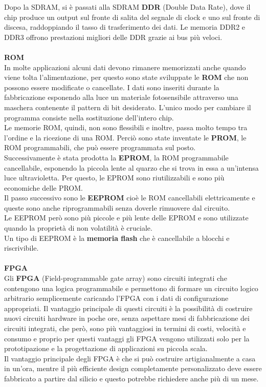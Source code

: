 \documentclass[12pt]{report}
\begin{document}
			Dopo la SDRAM, si è passati alla SDRAM \textbf{DDR} (Double Data Rate), dove il chip produce un output sul fronte di salita del segnale di clock e uno sul fronte di discesa, raddoppiando il tasso di trasferimento dei dati. Le memoria DDR2 e DDR3 offrono prestazioni migliori delle DDR grazie ai bus più veloci. \\ \\
			\textbf{ROM} \\
			In molte applicazioni alcuni dati devono rimanere memorizzati anche quando viene tolta l'alimentazione, per questo sono state sviluppate le \textbf{ROM} che non possono essere modificate o cancellate. I dati sono inseriti durante la fabbricazione esponendo alla luce un materiale fotosensibile attraverso una maschera contenente il pattern di bit desiderato. L'unico modo per cambiare il programma consiste nella sostituzione dell'intero chip. \\
			Le memorie ROM, quindi, non sono flessibili e inoltre, passa molto tempo tra l'ordine e la ricezione di una ROM. Perciò sono state inventate le \textbf{PROM}, le ROM programmabili, che può essere programmata sul posto. \\
			Successivamente è stata prodotta la \textbf{EPROM}, la ROM programmabile cancellabile, esponendo la piccola lente al quarzo che si trova in essa a un'intensa luce ultravioletta. Per questo, le EPROM sono riutilizzabili e sono più economiche delle PROM. \\
			Il passo successivo sono le \textbf{EEPROM} cioè le ROM cancellabili elettricamente e queste sono anche riprogrammabili senza doverle rimuovere dal circuito. \\
			Le EEPROM però sono più piccole e più lente delle EPROM e sono utilizzate quando la proprietà di non volatilità è cruciale. \\
			Un tipo di EEPROM è la \textbf{memoria flash} che è cancellabile a blocchi e riscrivibile. \\ \\
			\textbf{FPGA} \\
			Gli \textbf{FPGA} (Field-programmable gate array) sono circuiti integrati che contengono una logica programmabile e permettono di formare un circuito logico arbitrario semplicemente caricando l'FPGA con i dati di configurazione appropriati. Il vantaggio principale di questi circuiti è la possibilità di costruire nuovi circuiti hardware in poche ore, senza aspettare mesi di fabbricazione dei circuiti integrati, che però, sono più vantaggiosi in termini di costi, velocità e consumo e proprio per questi vantaggi gli FPGA vengono utilizzati solo per la prototipazione e la progettazione di applicazioni su piccola scala. \\
			Il vantaggio principale degli FPGA è che si può costruire artigianalmente a casa in un'ora, mentre il più efficiente design completamente personalizzato deve essere fabbricato a partire dal silicio e questo potrebbe richiedere anche più di un mese.
\end{document}

